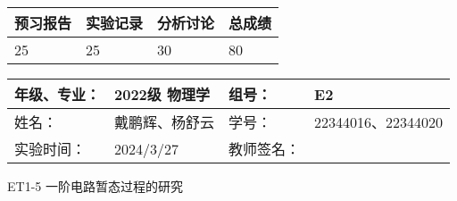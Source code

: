 \documentclass[dvipsnames, svgnames,a4paper,11pt]{article}
\begin{document}
	
	
	
	
	\begin{table}
		\renewcommand\arraystretch{1.7}
		\begin{tabularx}{\textwidth}{
				|X|X|X|X
				|X|X|X|X|}
			\hline
			\multicolumn{2}{|c|}{预习报告}&\multicolumn{2}{|c|}{实验记录}&\multicolumn{2}{|c|}{分析讨论}&\multicolumn{2}{|c|}{总成绩}\\
			\hline
			\LARGE25 & & \LARGE25 & & \LARGE30 & & \LARGE80 & \\
			\hline
		\end{tabularx}
	\end{table}
	
	\begin{table}
		\renewcommand\arraystretch{1.7}
		\begin{tabularx}{\textwidth}{|X|X|X|X|}
			\hline
			年级、专业： & 2022级 物理学 &组号： & E2\\
			\hline
			姓名： & 戴鹏辉、杨舒云  & 学号： & 22344016、22344020\\
			\hline
			实验时间： & 2024/3/27 & 教师签名： & \\
			\hline
		\end{tabularx}
	\end{table}
	
	\begin{center}
		\LARGE ET1-5 \quad 一阶电路暂态过程的研究
	\end{center}
	
	
\end{document}
